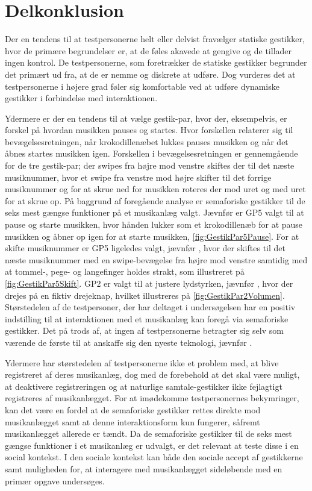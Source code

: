 \section{Delkonklusion}
\label{ValgAfGestikkerDelkonklusion}
%
Der en tendens til at testpersonerne helt eller delvist fravælger statiske gestikker, hvor de primære begrundelser er, at de føles akavede at gengive og de tillader ingen kontrol. De testpersonerne, som foretrækker de statiske gestikker begrunder det primært ud fra, at de er nemme og diskrete at udføre. Dog vurderes det at testpersonerne i højere grad føler sig komfortable ved at udføre dynamiske gestikker i forbindelse med interaktionen. 

Ydermere er der en tendens til at vælge gestik-par, hvor der, eksempelvis, er forskel på hvordan musikken pauses og startes. Hvor forskellen relaterer sig til bevægelsesretningen, når krokodillenæbet lukkes pauses musikken og når det åbnes startes musikken igen. Forskellen i bevægelsesretningen er gennemgående for de tre gestik-par; der swipes fra højre mod venstre skiftes der til det næste musiknummer, hvor et swipe fra venstre mod højre skifter til det forrige musiknummer og for at skrue ned for musikken roteres der mod uret og med uret for at skrue op.\blankline
%
På baggrund af foregående analyse er semaforiske gestikker til de seks mest gængse funktioner på et musikanlæg valgt. Jævnfør  er GP5 valgt til at pause og starte musikken, hvor hånden lukker som et krokodillenæb for at pause musikken og åbner op igen for at starte musikken, \autoref{fig:GestikPar5Pause}. For at skifte musiknummer er GP5 ligeledes valgt, jævnfør , hvor der skiftes til det næste musiknummer med en swipe-bevægelse fra højre mod venstre samtidig med at tommel-, pege- og langefinger holdes strakt, som illustreret på \autoref{fig:GestikPar5Skift}. GP2 er valgt til at justere lydstyrken, jævnfør , hvor der drejes på en fiktiv drejeknap, hvilket illustreres på \autoref{fig:GestikPar2Volumen}. Størstedelen af de testpersoner, der har deltaget i undersøgelsen har en positiv indstilling til at interaktionen med et musikanlæg kan foregå via semaforiske gestikker. Det på trods af, at ingen af testpersonerne betragter sig selv som værende de første til at anskaffe sig den nyeste teknologi, jævnfør . 

Ydermere har størstedelen af testpersonerne ikke et problem med, at blive registreret af deres musikanlæg, dog med de forebehold at det skal være muligt, at deaktivere registreringen og at naturlige samtale-gestikker ikke fejlagtigt registreres af musikanlægget. For at imødekomme testpersonernes bekymringer, kan det være en fordel at de semaforiske gestikker rettes direkte mod musikanlægget samt at denne interaktionsform kun fungerer, såfremt musikanlægget allerede er tændt. \blankline
%
Da de semaforiske gestikker til de seks mest gængse funktioner i et musikanlæg er udvalgt, er det relevant at teste disse i en social kontekst. I den sociale kontekst kan både den sociale accept af gestikkerne samt muligheden for, at interagere med musikanlægget sideløbende med en primær opgave undersøges. 